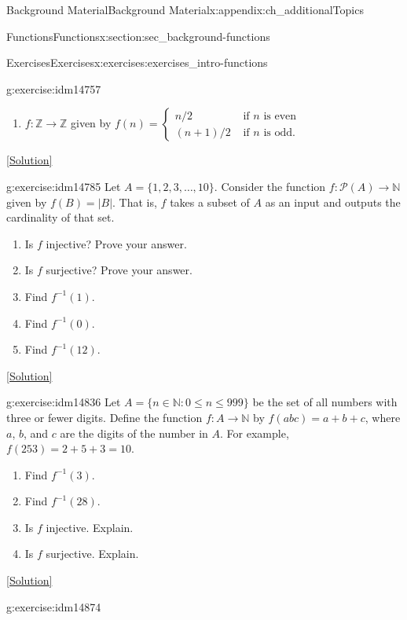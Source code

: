 \documentclass[oneside,10pt,]{book}
\numberwithin{equation}{chapter}
\def\N{\mathbb N}
\def\Z{\mathbb Z}
\def\pow{\mathcal P}
\def\inv{^{-1}}
\def\st{:}
\newcommand{\amp}{&}
\begin{document}
\begin{appendixptx}{Background Material}{}{Background Material}{}{}{x:appendix:ch_additionalTopics}
\begin{sectionptx}{Functions}{}{Functions}{}{}{x:section:sec_background-functions}
\begin{exercises-subsection}{Exercises}{}{Exercises}{}{}{x:exercises:exercises_intro-functions}
\begin{divisionexercise}{5}{}{}{g:exercise:idm14757}
\begin{enumerate}[label=(\alph*)]
\item{}\(f:\Z \to \Z\) given by \(f(n) = \begin{cases}n/2 \amp  \text{ if } n \text{ is even} \\ (n+1)/2 \amp \text{ if } n \text{ is odd} . \end{cases}\)%
\end{enumerate}
%
\space\hspace*{0pt}\hfill{\tiny\hyperlink{g:solution:idm14773-main}{[Solution]}}\end{divisionexercise}%
\begin{divisionexercise}{6}{}{}{g:exercise:idm14785}%
Let \(A = \{1,2,3,\ldots,10\}\). Consider the function \(f:\pow(A) \to \N\) given by \(f(B) = |B|\). That is, \(f\) takes a subset of \(A\) as an input and outputs the cardinality of that set.%
\begin{enumerate}[label=(\alph*)]
\item{}Is \(f\) injective? Prove your answer.%
\item{}Is \(f\) surjective? Prove your answer.%
\item{}Find \(f\inv(1)\).%
\item{}Find \(f\inv(0)\).%
\item{}Find \(f\inv(12)\).%
\end{enumerate}
%
\space\hspace*{0pt}\hfill{\tiny\hyperlink{g:solution:idm14809-main}{[Solution]}}\end{divisionexercise}%
\begin{divisionexercise}{7}{}{}{g:exercise:idm14836}%
Let \(A = \{n \in \N \st 0 \le n \le 999\}\) be the set of all numbers with three or fewer digits. Define the function \(f:A \to \N\) by \(f(abc) = a+b+c\), where \(a\), \(b\), and \(c\) are the digits of the number in \(A\). For example, \(f(253) = 2 + 5 + 3 =  10\).%
\begin{enumerate}[label=(\alph*)]
\item{}Find \(f\inv(3)\).%
\item{}Find \(f\inv(28)\).%
\item{}Is \(f\) injective. Explain.%
\item{}Is \(f\) surjective. Explain.%
\end{enumerate}
%
\space\hspace*{0pt}\hfill{\tiny\hyperlink{g:solution:idm14860-main}{[Solution]}}\end{divisionexercise}%
\begin{divisionexercise}{8}{}{}{g:exercise:idm14874}%

\end{divisionexercise}
\end{exercises-subsection}
\end{sectionptx}
\end{appendixptx}
\end{document}
